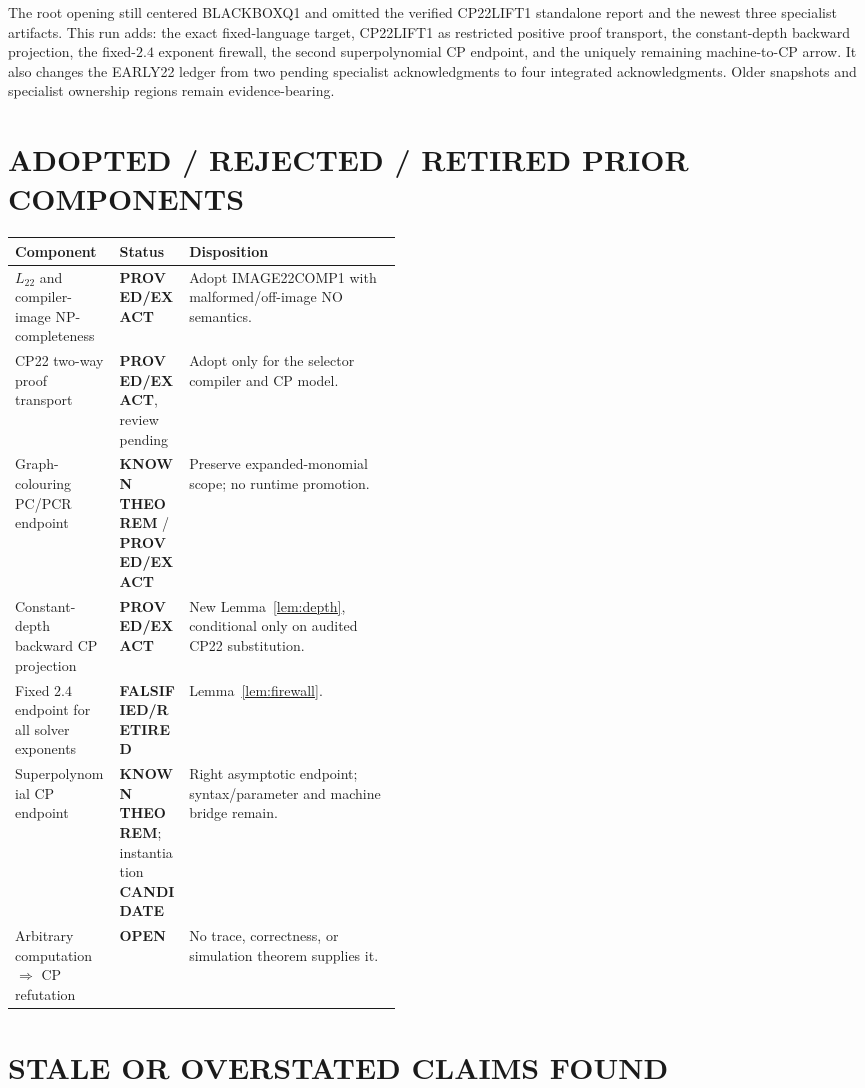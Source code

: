 \documentclass[11pt]{article}
\newcommand{\Ltwo}{L_{22}}
\newcommand{\OPEN}{\textbf{OPEN}}
\newcommand{\EXACT}{\textbf{PROVED/EXACT}}
\newcommand{\KNOWN}{\textbf{KNOWN THEOREM}}
\newcommand{\CAND}{\textbf{CANDIDATE}}
\newcommand{\RET}{\textbf{FALSIFIED/RETIRED}}
\begin{document}
The root opening still centered BLACKBOXQ1 and omitted the verified
CP22LIFT1 standalone report and the newest three specialist artifacts.  This
run adds: the exact fixed-language target, CP22LIFT1 as restricted positive
proof transport, the constant-depth backward projection, the fixed-$2.4$
exponent firewall, the second superpolynomial CP endpoint, and the uniquely
remaining machine-to-CP arrow.  It also changes the EARLY22 ledger from two
pending specialist acknowledgments to four integrated acknowledgments.
Older snapshots and specialist ownership regions remain evidence-bearing.

\section{ADOPTED / REJECTED / RETIRED PRIOR COMPONENTS}

\begin{center}\small
\begin{tabularx}{0.97\linewidth}{@{}p{0.27\linewidth}p{0.18\linewidth}X@{}}
\toprule
Component & Status & Disposition\\
\midrule
$\Ltwo$ and compiler-image NP-completeness & \EXACT & Adopt IMAGE22COMP1 with malformed/off-image NO semantics.\\
CP22 two-way proof transport & \EXACT, review pending & Adopt only for the selector compiler and CP model.\\
Graph-colouring PC/PCR endpoint & \KNOWN{} / \EXACT & Preserve expanded-monomial scope; no runtime promotion.\\
Constant-depth backward CP projection & \EXACT & New Lemma~\ref{lem:depth}, conditional only on audited CP22 substitution.\\
Fixed $2.4$ endpoint for all solver exponents & \RET & Lemma~\ref{lem:firewall}.\\
Superpolynomial CP endpoint & \KNOWN{}; instantiation \CAND & Right asymptotic endpoint; syntax/parameter and machine bridge remain.\\
Arbitrary computation $\Rightarrow$ CP refutation & \OPEN & No trace, correctness, or simulation theorem supplies it.\\
\bottomrule
\end{tabularx}
\end{center}

\section{STALE OR OVERSTATED CLAIMS FOUND}
\end{document}

